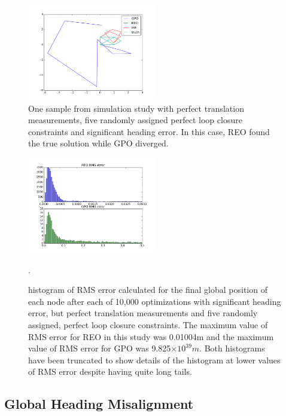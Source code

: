 \begin{figure}[H]
  \includegraphics[width=0.5\textwidth]{figures/GPO_diverged.png}
  \caption{One sample from simulation study with perfect translation measurements, five randomly assigned perfect loop closure constraints and significant heading error.  In this case, REO found the true solution while GPO diverged.}
  \label{fig:GPO_heading_divergence}
\end{figure}

\begin{figure}[H]
  \includegraphics[width=0.5\textwidth]{figures/GPO_vs_REO_bad.png}
  \caption{histogram of RMS error calculated for the final global position of each node after each of 10,000 optimizations with significant heading error, but perfect translation measurements and five randomly assigned, perfect loop closure constraints. The maximum value of RMS error for REO in this study was 0.01004m and the maximum value of RMS error for GPO was 9.825$\times 10 ^{39}m$. Both histograms have been truncated to show details of the histogram at lower values of RMS error despite having quite long tails.}
  \label{fig:GPO_bad_histogram}.
\end{figure}


\subsection{Global Heading Misalignment}

